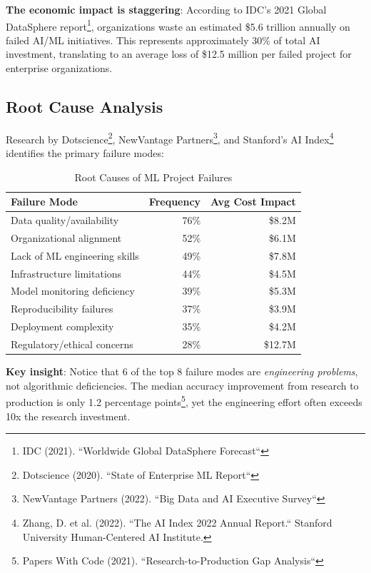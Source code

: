 \textbf{The economic impact is staggering}: According to IDC's 2021 Global DataSphere report\footnote{IDC (2021). ``Worldwide Global DataSphere Forecast``}, organizations waste an estimated \$5.6 trillion annually on failed AI/ML initiatives. This represents approximately 30\% of total AI investment, translating to an average loss of \$12.5 million per failed project for enterprise organizations.

\subsection{Root Cause Analysis}

Research by Dotscience\footnote{Dotscience (2020). ``State of Enterprise ML Report``}, NewVantage Partners\footnote{NewVantage Partners (2022). ``Big Data and AI Executive Survey``}, and Stanford's AI Index\footnote{Zhang, D. et al. (2022). ``The AI Index 2022 Annual Report.`` Stanford University Human-Centered AI Institute.} identifies the primary failure modes:

\begin{table}[h]
\centering
\caption{Root Causes of ML Project Failures}
\begin{tabular}{lrr}
\toprule
\textbf{Failure Mode} & \textbf{Frequency} & \textbf{Avg Cost Impact} \\
\midrule
Data quality/availability & 76\% & \$8.2M \\
Organizational alignment & 52\% & \$6.1M \\
Lack of ML engineering skills & 49\% & \$7.8M \\
Infrastructure limitations & 44\% & \$4.5M \\
Model monitoring deficiency & 39\% & \$5.3M \\
Reproducibility failures & 37\% & \$3.9M \\
Deployment complexity & 35\% & \$4.2M \\
Regulatory/ethical concerns & 28\% & \$12.7M \\
\bottomrule
\end{tabular}
\end{table}

\textbf{Key insight}: Notice that 6 of the top 8 failure modes are \emph{engineering problems}, not algorithmic deficiencies. The median accuracy improvement from research to production is only 1.2 percentage points\footnote{Papers With Code (2021). ``Research-to-Production Gap Analysis``}, yet the engineering effort often exceeds 10x the research investment.

